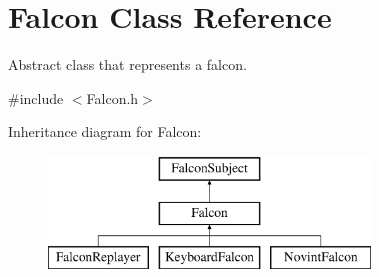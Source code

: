 \hypertarget{classFalcon}{
\section{Falcon Class Reference}
\label{classFalcon}
}


Abstract class that represents a falcon.  




{\ttfamily \#include $<$Falcon.h$>$}

Inheritance diagram for Falcon:\begin{figure}[H]
\begin{center}
\leavevmode
\includegraphics[height=3.000000cm]{classFalcon}
\end{center}
\end{figure}
